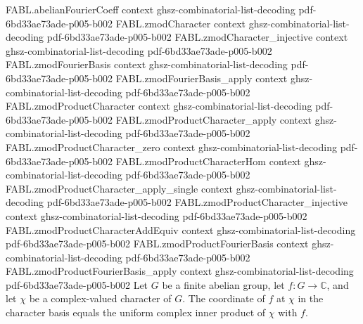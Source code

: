 \begin{theorem}
  {FABL.abelianFourierCoeff}
  {context}
  {ghsz-combinatorial-list-decoding}
  {pdf-6bd33ae73ade-p005-b002}
\proofstep
  {FABL.zmodCharacter}
  {context}
  {ghsz-combinatorial-list-decoding}
  {pdf-6bd33ae73ade-p005-b002}
\proofstep
  {FABL.zmodCharacter_injective}
  {context}
  {ghsz-combinatorial-list-decoding}
  {pdf-6bd33ae73ade-p005-b002}
\proofstep
  {FABL.zmodFourierBasis}
  {context}
  {ghsz-combinatorial-list-decoding}
  {pdf-6bd33ae73ade-p005-b002}
\proofstep
  {FABL.zmodFourierBasis_apply}
  {context}
  {ghsz-combinatorial-list-decoding}
  {pdf-6bd33ae73ade-p005-b002}
\proofstep
  {FABL.zmodProductCharacter}
  {context}
  {ghsz-combinatorial-list-decoding}
  {pdf-6bd33ae73ade-p005-b002}
\proofstep
  {FABL.zmodProductCharacter_apply}
  {context}
  {ghsz-combinatorial-list-decoding}
  {pdf-6bd33ae73ade-p005-b002}
\proofstep
  {FABL.zmodProductCharacter_zero}
  {context}
  {ghsz-combinatorial-list-decoding}
  {pdf-6bd33ae73ade-p005-b002}
\proofstep
  {FABL.zmodProductCharacterHom}
  {context}
  {ghsz-combinatorial-list-decoding}
  {pdf-6bd33ae73ade-p005-b002}
\proofstep
  {FABL.zmodProductCharacter_apply_single}
  {context}
  {ghsz-combinatorial-list-decoding}
  {pdf-6bd33ae73ade-p005-b002}
\proofstep
  {FABL.zmodProductCharacter_injective}
  {context}
  {ghsz-combinatorial-list-decoding}
  {pdf-6bd33ae73ade-p005-b002}
\proofstep
  {FABL.zmodProductCharacterAddEquiv}
  {context}
  {ghsz-combinatorial-list-decoding}
  {pdf-6bd33ae73ade-p005-b002}
\proofstep
  {FABL.zmodProductFourierBasis}
  {context}
  {ghsz-combinatorial-list-decoding}
  {pdf-6bd33ae73ade-p005-b002}
\proofstep
  {FABL.zmodProductFourierBasis_apply}
  {context}
  {ghsz-combinatorial-list-decoding}
  {pdf-6bd33ae73ade-p005-b002}
Let $G$ be a finite abelian group, let $f:G\to\mathbb C$, and let $\chi$ be a
complex-valued character of $G$. The coordinate of $f$ at $\chi$ in the character basis
equals the uniform complex inner product of $\chi$ with $f$.
\end{theorem}

